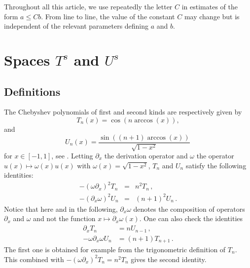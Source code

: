 \documentclass[a4paper]{article}
\begin{document}
\begin{Rem}
	Throughout all this article, we use repeatedly the letter $C$ in estimates of the form $ a \leq C b$. From line to line, the value of the constant $C$ may change but is independent of the relevant parameters defining $a$ and $b$. 
\end{Rem}

 
\section{Spaces $T^s$ and $U^s$}

\subsection{Definitions}

\label{sec:analyticalSetting}

The Chebyshev polynomials of first and second kinds are respectively given by
\[T_n(x) = \cos(n \arccos(x)),\]
and 
\[U_n(x) = \dfrac{\sin((n+1) \arccos(x))}{\sqrt{1 - x^2}}\,\]
for $x \in [-1,1]$, see \cite{mason2002chebyshev}. Letting $\partial_x$ the derivation operator and $\omega$ the operator $u(x) \mapsto \omega(x)u(x)$ with $\omega(x) = \sqrt{1 - x^2}$, $T_n$ and $U_n$ satisfy the following identities:
\begin{eqnarray}
	-(\omega\partial_x)^2 T_n &=& n^2T_n\,, \label{cheb1}\\
	-(\partial_x\omega)^2 U_n &=& (n+1)^2U_n\, .\label{cheb2}
\end{eqnarray}
Notice that here and in the following, $\partial_x\omega$ denotes the composition of operators $\partial_x$ and $\omega$ and not the function $x \mapsto \partial_x\omega(x)$. One can also check the identities 
\begin{align}
\partial_x T_n &= n U_{n-1}\,, \label{der1} \\
-\omega \partial_x \omega U_n &= (n+1)T_{n+1}\,. \label{der2}
\end{align}
The first one is obtained for example from the trigonometric definition of $T_n$. This combined with $-(\omega \partial_x)^2 T_n = n^2 T_n$ gives the second identity. 
\end{document}
